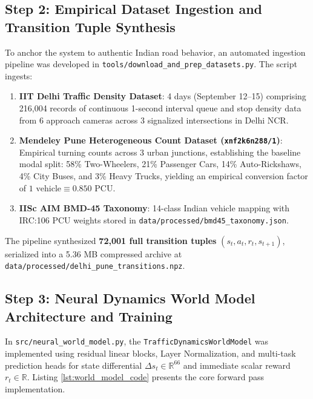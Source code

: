 \documentclass[12pt,a4paper,oneside]{report}
\begin{document}
\subsection*{Step 2: Empirical Dataset Ingestion and Transition Tuple Synthesis}
To anchor the system to authentic Indian road behavior, an automated ingestion pipeline was developed in \texttt{tools/download\_and\_prep\_datasets.py}. The script ingests:
\begin{enumerate}
    \item \textbf{IIT Delhi Traffic Density Dataset}: 4 days (September 12--15) comprising 216,004 records of continuous 1-second interval queue and stop density data from 6 approach cameras across 3 signalized intersections in Delhi NCR.
    \item \textbf{Mendeley Pune Heterogeneous Count Dataset (\texttt{xnf2k6n288/1})}: Empirical turning counts across 3 urban junctions, establishing the baseline modal split: 58\% Two-Wheelers, 21\% Passenger Cars, 14\% Auto-Rickshaws, 4\% City Buses, and 3\% Heavy Trucks, yielding an empirical conversion factor of $1 \text{ vehicle} \equiv 0.850 \text{ PCU}$.
    \item \textbf{IISc AIM BMD-45 Taxonomy}: 14-class Indian vehicle mapping with IRC:106 PCU weights stored in \texttt{data/processed/bmd45\_taxonomy.json}.
\end{enumerate}
The pipeline synthesized \textbf{72,001 full transition tuples} $(s_t, a_t, r_t, s_{t+1})$, serialized into a 5.36 MB compressed archive at \texttt{data/processed/delhi\_pune\_transitions.npz}.

\subsection*{Step 3: Neural Dynamics World Model Architecture and Training}
In \texttt{src/neural\_world\_model.py}, the \texttt{TrafficDynamicsWorldModel} was implemented using residual linear blocks, Layer Normalization, and multi-task prediction heads for state differential $\Delta s_t \in \mathbb{R}^{66}$ and immediate scalar reward $r_t \in \mathbb{R}$. Listing \ref{lst:world_model_code} presents the core forward pass implementation.
\end{document}
